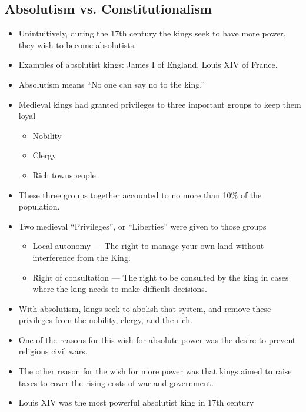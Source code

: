 \documentclass{article}
\begin{document}
\begin{spacing}{1.2}
    \section{Absolutism vs. Constitutionalism}
    \begin{itemize}
        \item Unintuitively, during the 17th century the kings seek to have more
            power, they wish to become absolutists.
        \item Examples of absolutist kings: James I of England, Louis XIV of
            France.
        \item Absolutism means ``No one can say no to the king.''
        \item Medieval kings had granted privileges to three important groups to
            keep them loyal
            \begin{itemize}
                \item Nobility
                \item Clergy
                \item Rich townspeople
            \end{itemize}
        \item These three groups together accounted to no more than 10\% of the
            population.
        \item Two medieval ``Privileges'', or ``Liberties'' were given to those
            groups
            \begin{itemize}
                \item Local autonomy --- The right to manage your own land
                    without interference from the King.
                \item Right of consultation --- The right to be consulted by the
                    king in cases where the king needs to make difficult
                    decisions.
            \end{itemize}
        \item With absolutism, kings seek to abolish that system, and remove
            these privileges from the nobility, clergy, and the rich.
        \item One of the reasons for this wish for absolute power was the desire
            to prevent religious civil wars.
        \item The other reason for the wish for more power was that kings aimed
            to raise taxes to cover the rising costs of war and government.
        \item Louis XIV was the most powerful absolutist king in 17th century

\end{itemize}
\end{spacing}
\end{document}
